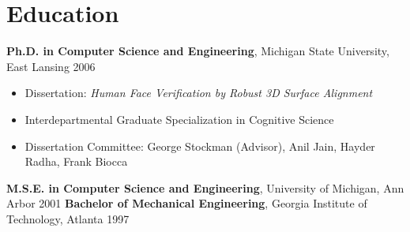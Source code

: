 \section*{Education}

\textbf{Ph.D. in Computer Science and Engineering}, 
Michigan State University, East Lansing \hfill 2006

\begin{itemize}
  \item Dissertation: \emph{Human Face Verification by Robust 3D Surface Alignment}
  \item Interdepartmental Graduate Specialization in Cognitive Science
  \item Dissertation Committee: George Stockman (Advisor), Anil Jain, Hayder Radha, Frank Biocca
\end{itemize}

\textbf{M.S.E. in Computer Science and Engineering}, 
University of Michigan, Ann Arbor \hfill 2001
\textbf{Bachelor of Mechanical Engineering}, 
Georgia Institute of Technology, Atlanta \hfill 1997